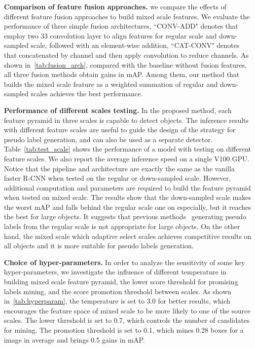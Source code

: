 \documentclass[10pt,twocolumn,letterpaper]{article}
\begin{document}
\noindent \textbf{Comparison of feature fusion approaches.} we compare the effects of different feature fusion approaches to build mixed scale features. We evaluate the performance of three simple fusion architectures, \ie ``CONV-ADD" denotes that employ two 33 convolution layer to align features for regular scale and down-sampled scale, followed with an element-wise addition, ``CAT-CONV" denotes that concatenated by channel and then apply convolution to reduce channels. As shown in~\cref{tab:fusion_arch}, compared with the baseline without fusion features, all three fusion methods obtain gains in mAP. Among them, our method that builds the mixed scale feature as a weighted summation of regular and down-sampled scales achieves the best performance.


\noindent \textbf{Performance of different scales testing.} In the proposed method, each feature pyramid in three scales is capable to detect objects. The inference results with different feature scales are useful to guide the design of the strategy for pseudo label generation, and can also be used as a separate detector. Table~\ref{tab:test_scale} shows the performance of a model with testing on different feature scales. We also report the average inference speed on a single V100 GPU. Notice that the pipeline and architecture are exactly the same as the vanilla faster R-CNN when tested on the regular or down-sampled scale. However, additional computation and parameters are required to build the feature pyramid when tested on mixed scale. The results show that the down-sampled scale makes the worst mAP and falls behind the regular scale one on  especially, but it reaches the best  for large objects. It suggests that previous methods~\cite{sed, pseco} generating pseudo labels from the regular scale is not appropriate for large objects. On the other hand, the mixed scale which adaptive select scales achieves competitive results on all objects and it is more suitable for pseudo labels generation.

\vspace{.3em}
\noindent \textbf{Choice of hyper-parameters.} In order to analyze the sensitivity of some key hyper-parameters, we investigate the influence of different temperature  in building mixed scale feature pyramid, the lower score threshold  for promising labels mining, and the score promotion threshold  between scales. As shown in~\cref{tab:hyperparam}, the temperature  is set to 3.0 for better results, which encourages the feature space of mixed scale to be more likely to one of the source scales. The lower threshold  is set to 0.7, which controls the number of candidates for mining. The promotion threshold  is set to 0.1, which mines 0.28 boxes for a image in average and brings 0.5 gains in mAP.
\end{document}
